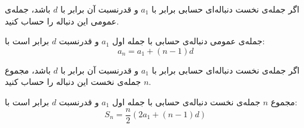 \begin{PROBLEM}
	\p
   اگر جمله‌ی نخست دنباله‌ای حسابی برابر با
$a_1$
 و قدرنسبت آن برابر با
$d$
باشد، جمله‌ی عمومی این دنباله را حساب کنید.

\end{PROBLEM}
    \begin{THEOREM}
        \p
        جمله‌ی عمومی دنباله‌ی حسابی با
        جمله اول $a_1$
        و قدرنسبت $d$ برابر است با:
        $$a_n = a_1 + (n - 1)d$$
    \end{THEOREM}





\begin{PROBLEM}
	\p
   اگر جمله‌ی نخست دنباله‌ای حسابی برابر با
    $a_1$
    و قدرنسبت آن برابر با
    $d$
    باشد، مجموع
    $n$
    جمله‌ی نخست این دنباله را حساب کنید.

\end{PROBLEM}
        \begin{THEOREM}
            \p
            مجموع
            $n$
            جمله‌ی نخست دنباله‌ی حسابی با
            جمله اول $a_1$
            و قدرنسبت $d$
            برابر است با:
            $$S_n = \frac{n}{2}(2a_1 + (n - 1)d)$$
        \end{THEOREM}